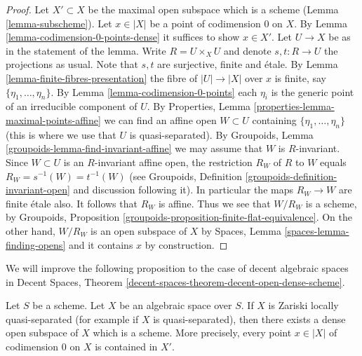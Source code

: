 \begin{proof}
Let $X' \subset X$ be the maximal open subspace which is a scheme
(Lemma \ref{lemma-subscheme}).
Let $x \in |X|$ be a point of codimension $0$ on $X$.
By Lemma \ref{lemma-codimension-0-points-dense}
it suffices to show $x \in X'$.
Let $U \to X$ be as in the statement of the lemma.
Write $R = U \times_X U$ and denote $s, t : R \to U$ the projections as usual.
Note that $s, t$ are surjective, finite and \'etale.
By Lemma \ref{lemma-finite-fibres-presentation}
the fibre of $|U| \to |X|$ over $x$ is finite, say
$\{\eta_1, \ldots, \eta_n\}$. By Lemma \ref{lemma-codimension-0-points}
each $\eta_i$ is the generic point of an irreducible component of $U$.
By Properties, Lemma \ref{properties-lemma-maximal-points-affine}
we can find an affine open $W \subset U$ containing
$\{\eta_1, \ldots, \eta_n\}$
(this is where we use that $U$ is quasi-separated). By
Groupoids, Lemma \ref{groupoids-lemma-find-invariant-affine}
we may assume that $W$ is $R$-invariant.
Since $W \subset U$ is an $R$-invariant affine open, the restriction
$R_W$ of $R$ to $W$ equals $R_W = s^{-1}(W) = t^{-1}(W)$ (see
Groupoids, Definition \ref{groupoids-definition-invariant-open}
and discussion following it). In particular the maps $R_W \to W$ are
finite \'etale also. It follows that $R_W$ is affine.
Thus we see that $W/R_W$ is a scheme, by
Groupoids, Proposition \ref{groupoids-proposition-finite-flat-equivalence}.
On the other hand, $W/R_W$ is an open subspace of $X$ by
Spaces, Lemma \ref{spaces-lemma-finding-opens} and it contains
$x$ by construction.
\end{proof}

\noindent
We will improve the following proposition to the case of
decent algebraic spaces in
Decent Spaces, Theorem
\ref{decent-spaces-theorem-decent-open-dense-scheme}.

\begin{proposition}
\label{proposition-locally-quasi-separated-open-dense-scheme}
Let $S$ be a scheme. Let $X$ be an algebraic space over $S$. If $X$ is
Zariski locally quasi-separated (for example if $X$ is quasi-separated), then
there exists a dense open subspace of $X$ which is a scheme.
More precisely, every point $x \in |X|$ of codimension $0$ on $X$
is contained in $X'$.
\end{proposition}

